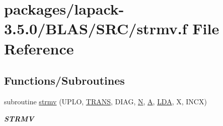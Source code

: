 \hypertarget{lapack-3_85_80_2BLAS_2SRC_2strmv_8f}{}\section{packages/lapack-\/3.5.0/\+B\+L\+A\+S/\+S\+R\+C/strmv.f File Reference}
\label{lapack-3_85_80_2BLAS_2SRC_2strmv_8f}
\subsection*{Functions/\+Subroutines}
\begin{DoxyCompactItemize}
\item 
subroutine \hyperlink{group__single__blas__level2_ga2ff27ee8951accd778cd785023f71ac0}{strmv} (U\+P\+L\+O, \hyperlink{superlu__enum__consts_8h_a0c4e17b2d5cea33f9991ccc6a6678d62a1f61e3015bfe0f0c2c3fda4c5a0cdf58}{T\+R\+A\+N\+S}, D\+I\+A\+G, \hyperlink{polmisc_8c_a0240ac851181b84ac374872dc5434ee4}{N}, \hyperlink{classA}{A}, \hyperlink{example__user_8c_ae946da542ce0db94dced19b2ecefd1aa}{L\+D\+A}, X, I\+N\+C\+X)
\begin{DoxyCompactList}\small\item\em {\bfseries S\+T\+R\+M\+V} \end{DoxyCompactList}\end{DoxyCompactItemize}
